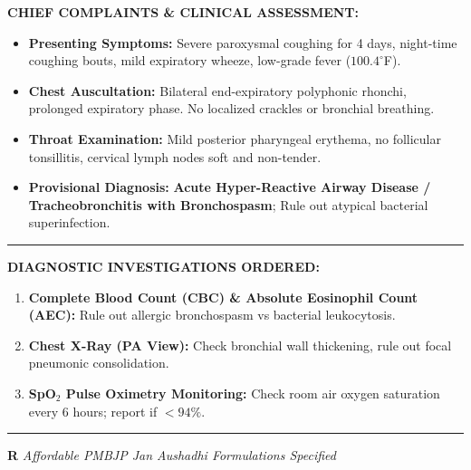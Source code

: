 \documentclass[9pt,a4paper]{article}
\begin{document}
\begin{tcolorbox}[
    colback=white,
    colframe=primary,
    arc=3mm,
    boxrule=1.5pt,
    left=8pt, right=8pt, top=5pt, bottom=5pt
]
\vspace{1pt}
\noindent\textbf{\color{primarydark}CHIEF COMPLAINTS \& CLINICAL ASSESSMENT:}
\begin{itemize}[leftmargin=14pt, topsep=1pt, itemsep=0.5pt]
    \item \textbf{Presenting Symptoms:} Severe paroxysmal coughing for 4 days, night-time coughing bouts, mild expiratory wheeze, low-grade fever ($100.4^\circ$F).
    \item \textbf{Chest Auscultation:} Bilateral end-expiratory polyphonic rhonchi, prolonged expiratory phase. No localized crackles or bronchial breathing.
    \item \textbf{Throat Examination:} Mild posterior pharyngeal erythema, no follicular tonsillitis, cervical lymph nodes soft and non-tender.
    \item \textbf{Provisional Diagnosis:} \textbf{Acute Hyper-Reactive Airway Disease / Tracheobronchitis with Bronchospasm}; Rule out atypical bacterial superinfection.
\end{itemize}

\vspace{1pt}
\noindent\textcolor{primary}{\rule{\linewidth}{0.8pt}}

\vspace{1pt}
\noindent\textbf{\color{primarydark}DIAGNOSTIC INVESTIGATIONS ORDERED:}
\begin{enumerate}[leftmargin=14pt, topsep=1pt, itemsep=0.5pt]
    \item \textbf{Complete Blood Count (CBC) \& Absolute Eosinophil Count (AEC):} Rule out allergic bronchospasm vs bacterial leukocytosis.
    \item \textbf{Chest X-Ray (PA View):} Check bronchial wall thickening, rule out focal pneumonic consolidation.
    \item \textbf{SpO$_2$ Pulse Oximetry Monitoring:} Check room air oxygen saturation every 6 hours; report if $< 94\%$.
\end{enumerate}

\vspace{1pt}
\noindent\textcolor{linegray}{\rule{\linewidth}{0.6pt}}

\vspace{1pt}
{\LARGE\textbf{\color{primary}R}} \hfill {\scriptsize\textit{\color{darktext}Affordable PMBJP Jan Aushadhi Formulations Specified}}


\end{tcolorbox}
\end{document}
